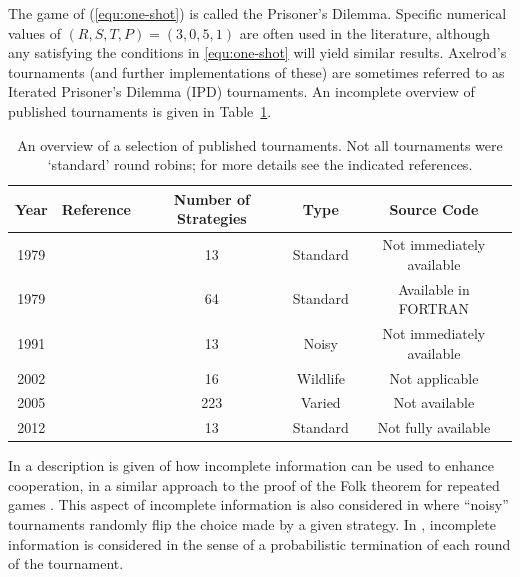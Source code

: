\documentclass{article}
\begin{document}
The game of (\ref{equ:one-shot}) is called the Prisoner's Dilemma. Specific
numerical values of \((R,S,T,P)=(3,0,5,1)\) are often used in the literature,
although any satisfying the conditions in \ref{equ:one-shot} will yield similar
results.  Axelrod's tournaments (and further implementations of these) are
sometimes referred to as Iterated Prisoner's Dilemma (IPD) tournaments. An
incomplete overview of published tournaments is given in
Table~\ref{tab:tournaments}.

\begin{table}[!hbtp]
    \begin{center}
        \begin{tabular}{ccccc}
            \toprule
            Year     & Reference                  & Number of Strategies & Type     & Source Code\\
            \midrule
            1979     & \cite{Axelrod1980a}        & 13                   & Standard & Not immediately available\\
            1979     & \cite{Axelrod1980b}        & 64                   & Standard & Available in FORTRAN\\
            1991     & \cite{Bendor1991}          & 13                   & Noisy    & Not immediately available\\
            2002     & \cite{Stephens2002}        & 16                   & Wildlife & Not applicable\\
            2005     & \cite{kendall2007iterated} & 223                  & Varied   & Not available \\
            2012     & \cite{Stewart2012}         & 13                   & Standard & Not fully available \\
            \bottomrule
        \end{tabular}
    \end{center}
    \caption{An overview of a selection of published tournaments. Not all
             tournaments were `standard' round robins; for more details
             see the indicated references.}\label{tab:tournaments}
\end{table}

In \cite{Milgrom1982} a description is given of how incomplete information can
be used to enhance cooperation, in a similar approach to the proof of the Folk
theorem for repeated games \cite{Maschler2013}. This aspect of incomplete
information is also considered in \cite{Bendor1991, Lee2015, Molander1985} where
``noisy'' tournaments randomly flip the choice made by a given strategy. In
\cite{Murnighan2015}, incomplete information is considered in the sense of a
probabilistic termination of each round of the tournament.
\end{document}
